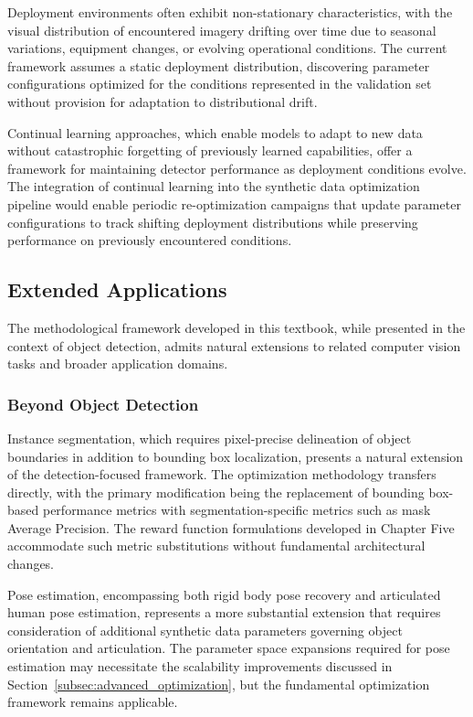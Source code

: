 Deployment environments often exhibit non-stationary characteristics, with the visual distribution of encountered imagery drifting over time due to seasonal variations, equipment changes, or evolving operational conditions. The current framework assumes a static deployment distribution, discovering parameter configurations optimized for the conditions represented in the validation set without provision for adaptation to distributional drift.

Continual learning approaches, which enable models to adapt to new data without catastrophic forgetting of previously learned capabilities, offer a framework for maintaining detector performance as deployment conditions evolve. The integration of continual learning into the synthetic data optimization pipeline would enable periodic re-optimization campaigns that update parameter configurations to track shifting deployment distributions while preserving performance on previously encountered conditions.

\subsection{Extended Applications}
\label{subsec:extended_applications}

The methodological framework developed in this textbook, while presented in the context of object detection, admits natural extensions to related computer vision tasks and broader application domains.

\subsubsection{Beyond Object Detection}
\label{subsubsec:beyond_detection}

Instance segmentation, which requires pixel-precise delineation of object boundaries in addition to bounding box localization, presents a natural extension of the detection-focused framework. The optimization methodology transfers directly, with the primary modification being the replacement of bounding box-based performance metrics with segmentation-specific metrics such as mask Average Precision. The reward function formulations developed in Chapter Five accommodate such metric substitutions without fundamental architectural changes.

Pose estimation, encompassing both rigid body pose recovery and articulated human pose estimation, represents a more substantial extension that requires consideration of additional synthetic data parameters governing object orientation and articulation. The parameter space expansions required for pose estimation may necessitate the scalability improvements discussed in Section~\ref{subsec:advanced_optimization}, but the fundamental optimization framework remains applicable.

